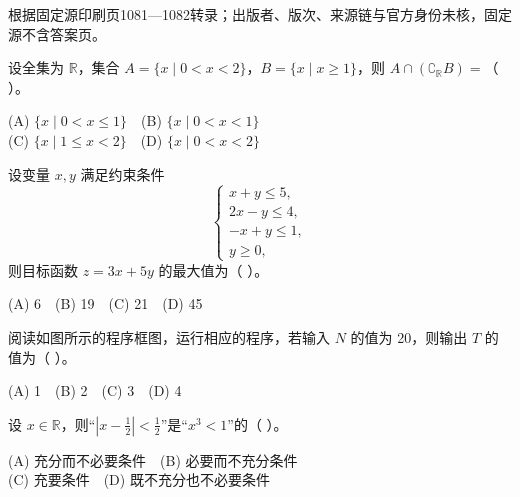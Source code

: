 


\begin{gktip}
根据固定源印刷页1081—1082转录；出版者、版次、来源链与官方身份未核，固定源不含答案页。
\end{gktip}


\begin{question}
设全集为 $\mathbb R$，集合 $A=\{x\mid 0<x<2\}$，$B=\{x\mid x\geqslant1\}$，则 $A\cap(\complement_{\mathbb R}B)=$（ ）。

(A) $\{x\mid 0<x\leqslant1\}$　(B) $\{x\mid 0<x<1\}$\\
(C) $\{x\mid 1\leqslant x<2\}$　(D) $\{x\mid 0<x<2\}$

\end{question}
\begin{question}
设变量 $x,y$ 满足约束条件
\nopagebreak[4]
\[
\begin{cases}
x+y\leqslant5,\\
2x-y\leqslant4,\\
-x+y\leqslant1,\\
y\geqslant0,
\end{cases}
\]
则目标函数 $z=3x+5y$ 的最大值为（ ）。

(A) 6　(B) 19　(C) 21　(D) 45

\Needspace{0.4\textheight}
\end{question}
\begingroup
\renewenvironment{question}{\Needspace{0.5\textheight}}{}
\begin{question}

阅读如图所示的程序框图，运行相应的程序，若输入 $N$ 的值为 20，则输出 $T$ 的值为（ ）。
\nopagebreak[4]
\begin{center}\end{center}
\nopagebreak[4]
(A) 1　(B) 2　(C) 3　(D) 4

\end{question}
\endgroup
\begin{question}
设 $x\in\mathbb R$，则“$\left|x-\frac12\right|<\frac12$”是“$x^3<1$”的（ ）。

(A) 充分而不必要条件　(B) 必要而不充分条件\\
(C) 充要条件　(D) 既不充分也不必要条件

\end{question}
